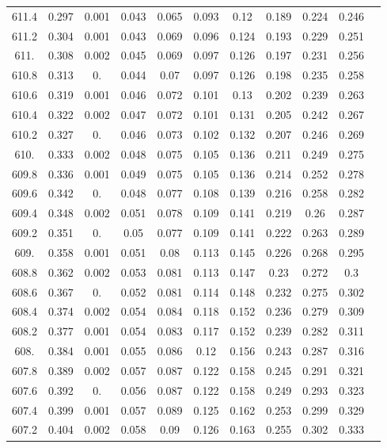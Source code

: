 \documentclass[12pt]{ctexart}
\numberwithin{equation}{section}
\begin{document}
\begin{longtable}{ccccccccccc}
611.4	&	0.297	&	0.001	&	0.043	&	0.065	&	0.093	&	0.12	&	0.189	&	0.224	&	0.246	\\
611.2	&	0.304	&	0.001	&	0.043	&	0.069	&	0.096	&	0.124	&	0.193	&	0.229	&	0.251	\\
611.	&	0.308	&	0.002	&	0.045	&	0.069	&	0.097	&	0.126	&	0.197	&	0.231	&	0.256	\\
610.8	&	0.313	&	0.	&	0.044	&	0.07	&	0.097	&	0.126	&	0.198	&	0.235	&	0.258	\\
610.6	&	0.319	&	0.001	&	0.046	&	0.072	&	0.101	&	0.13	&	0.202	&	0.239	&	0.263	\\
610.4	&	0.322	&	0.002	&	0.047	&	0.072	&	0.101	&	0.131	&	0.205	&	0.242	&	0.267	\\
610.2	&	0.327	&	0.	&	0.046	&	0.073	&	0.102	&	0.132	&	0.207	&	0.246	&	0.269	\\
610.	&	0.333	&	0.002	&	0.048	&	0.075	&	0.105	&	0.136	&	0.211	&	0.249	&	0.275	\\
609.8	&	0.336	&	0.001	&	0.049	&	0.075	&	0.105	&	0.136	&	0.214	&	0.252	&	0.278	\\
609.6	&	0.342	&	0.	&	0.048	&	0.077	&	0.108	&	0.139	&	0.216	&	0.258	&	0.282	\\
609.4	&	0.348	&	0.002	&	0.051	&	0.078	&	0.109	&	0.141	&	0.219	&	0.26	&	0.287	\\
609.2	&	0.351	&	0.	&	0.05	&	0.077	&	0.109	&	0.141	&	0.222	&	0.263	&	0.289	\\
609.	&	0.358	&	0.001	&	0.051	&	0.08	&	0.113	&	0.145	&	0.226	&	0.268	&	0.295	\\
608.8	&	0.362	&	0.002	&	0.053	&	0.081	&	0.113	&	0.147	&	0.23	&	0.272	&	0.3	\\
608.6	&	0.367	&	0.	&	0.052	&	0.081	&	0.114	&	0.148	&	0.232	&	0.275	&	0.302	\\
608.4	&	0.374	&	0.002	&	0.054	&	0.084	&	0.118	&	0.152	&	0.236	&	0.279	&	0.309	\\
608.2	&	0.377	&	0.001	&	0.054	&	0.083	&	0.117	&	0.152	&	0.239	&	0.282	&	0.311	\\
608.	&	0.384	&	0.001	&	0.055	&	0.086	&	0.12	&	0.156	&	0.243	&	0.287	&	0.316	\\
607.8	&	0.389	&	0.002	&	0.057	&	0.087	&	0.122	&	0.158	&	0.245	&	0.291	&	0.321	\\
607.6	&	0.392	&	0.	&	0.056	&	0.087	&	0.122	&	0.158	&	0.249	&	0.293	&	0.323	\\
607.4	&	0.399	&	0.001	&	0.057	&	0.089	&	0.125	&	0.162	&	0.253	&	0.299	&	0.329	\\
607.2	&	0.404	&	0.002	&	0.058	&	0.09	&	0.126	&	0.163	&	0.255	&	0.302	&	0.333	\\

\end{longtable}
\end{document}
